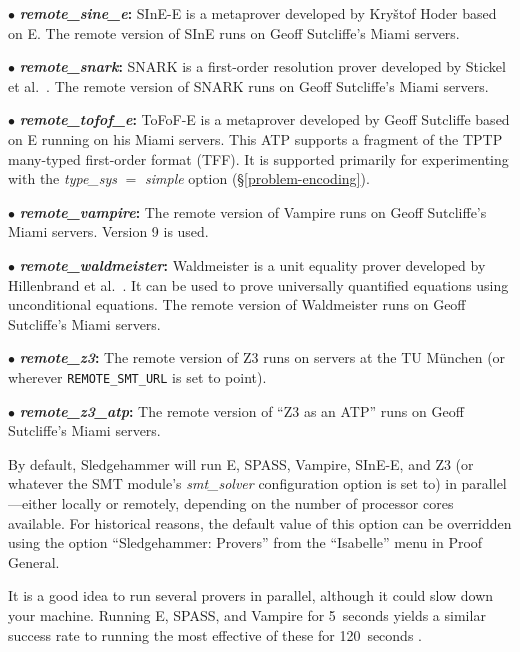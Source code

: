 \documentclass[a4paper,12pt]{article}
\begin{document}
\begin{enum}
\begin{enum}
\item[$\bullet$] \textbf{\textit{remote\_sine\_e}:} SInE-E is a metaprover
developed by Kry\v stof Hoder \cite{sine} based on E. The remote version of
SInE runs on Geoff Sutcliffe's Miami servers.

\item[$\bullet$] \textbf{\textit{remote\_snark}:} SNARK is a first-order
resolution prover developed by Stickel et al.\ \cite{snark}. The remote version
of SNARK runs on Geoff Sutcliffe's Miami servers.

\item[$\bullet$] \textbf{\textit{remote\_tofof\_e}:} ToFoF-E is a metaprover
developed by Geoff Sutcliffe \cite{tofof} based on E running on his Miami
servers. This ATP supports a fragment of the TPTP many-typed first-order format
(TFF). It is supported primarily for experimenting with the
\textit{type\_sys} $=$ \textit{simple} option (\S\ref{problem-encoding}).

\item[$\bullet$] \textbf{\textit{remote\_vampire}:} The remote version of
Vampire runs on Geoff Sutcliffe's Miami servers. Version 9 is used.

\item[$\bullet$] \textbf{\textit{remote\_waldmeister}:} Waldmeister is a unit
equality prover developed by Hillenbrand et al.\ \cite{waldmeister}. It can be
used to prove universally quantified equations using unconditional equations.
The remote version of Waldmeister runs on Geoff Sutcliffe's Miami servers.

\item[$\bullet$] \textbf{\textit{remote\_z3}:} The remote version of Z3 runs on
servers at the TU M\"unchen (or wherever \texttt{REMOTE\_SMT\_URL} is set to
point).

\item[$\bullet$] \textbf{\textit{remote\_z3\_atp}:} The remote version of ``Z3
as an ATP'' runs on Geoff Sutcliffe's Miami servers.
\end{enum}

By default, Sledgehammer will run E, SPASS, Vampire, SInE-E, and Z3 (or whatever
the SMT module's \textit{smt\_solver} configuration option is set to) in
parallel---either locally or remotely, depending on the number of processor
cores available. For historical reasons, the default value of this option can be
overridden using the option ``Sledgehammer: Provers'' from the ``Isabelle'' menu
in Proof General.

It is a good idea to run several provers in parallel, although it could slow
down your machine. Running E, SPASS, and Vampire for 5~seconds yields a similar
success rate to running the most effective of these for 120~seconds
\cite{boehme-nipkow-2010}.


\end{enum}
\end{document}
